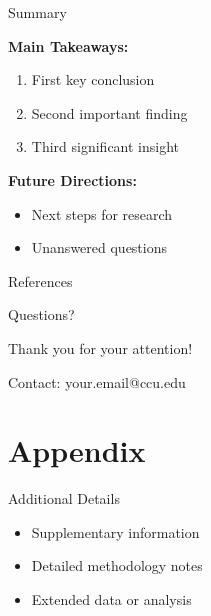 \documentclass[
  12pt,
  aspectratio=169,  %
  t,                %
  ignorenonframetext %
]{beamer}
\begin{document}
\begin{frame}{Summary}
  
  \textbf{Main Takeaways:}
  \begin{enumerate}
    \item First key conclusion
    \item Second important finding
    \item Third significant insight
  \end{enumerate}
  
  \vspace{1em}
  
  \textbf{Future Directions:}
  \begin{itemize}
    \item Next steps for research
    \item Unanswered questions
  \end{itemize}
  
\end{frame}

\begin{frame}[allowframebreaks]{References}
  \printbibliography[heading=none]
\end{frame}

\begin{frame}{Questions?}
  
  \begin{center}
    \Large Thank you for your attention!
    
    \vspace{2em}
    
    \normalsize
    Contact: your.email@ccu.edu
  \end{center}
  
\end{frame}

\appendix

\section{Appendix}

\begin{frame}[noframenumbering]{Additional Details}
  
  \begin{itemize}
    \item Supplementary information
    \item Detailed methodology notes
    \item Extended data or analysis
  \end{itemize}
  
\end{frame}
\end{document}
